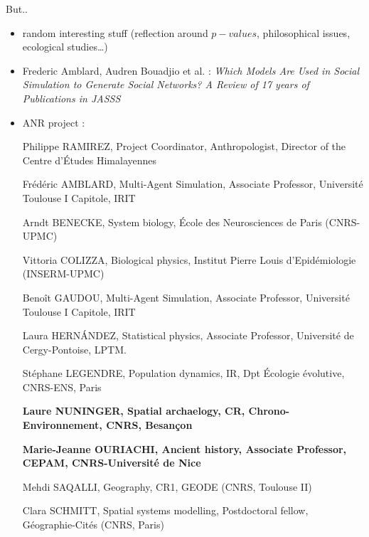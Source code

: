 \documentclass[9pt, handout=show,notes=show]{beamer}
\begin{document}
\begin{frame}{But..}
    \begin{itemize}
	\item random interesting stuff (reflection around $p-values$, philosophical issues, ecological studies\dots)
	\item Frederic Amblard, Audren Bouadjio et al. : \emph{Which Models Are Used in Social Simulation to Generate Social Networks? A Review of 17 years of Publications in JASSS}


	\item ANR project :
	    \begin{center}
		\begin{minipage}{.9\textwidth}
		    \scriptsize


		    Philippe RAMIREZ, Project Coordinator, Anthropologist, Director of the Centre d’Études Himalayennes 

		    Frédéric AMBLARD, Multi-Agent Simulation, Associate Professor, Université Toulouse I Capitole, IRIT

		    Arndt BENECKE, System biology, École des Neurosciences de Paris (CNRS-UPMC)

		    Vittoria COLIZZA, Biological physics, Institut Pierre Louis d'Epidémiologie (INSERM-UPMC)

		    Benoît GAUDOU, Multi-Agent Simulation, Associate Professor, Université Toulouse I Capitole, IRIT

		    Laura HERNÁNDEZ, Statistical physics, Associate Professor, Université de Cergy-Pontoise, LPTM.

		    Stéphane LEGENDRE, Population dynamics, IR, Dpt Écologie évolutive, CNRS-ENS, Paris

		    \textbf{Laure NUNINGER, Spatial archaelogy, CR, Chrono-Environnement, CNRS, Besançon}

		    \textbf{Marie-Jeanne OURIACHI, Ancient history, Associate Professor, CEPAM, CNRS-Université de Nice}

		    Mehdi SAQALLI, Geography, CR1, GEODE (CNRS, Toulouse II)

		    Clara SCHMITT, Spatial systems modelling, Postdoctoral fellow, Géographie-Cités (CNRS, Paris) 


		\end{minipage}
	    \end{center}
    \end{itemize}

\end{frame}
\end{document}
